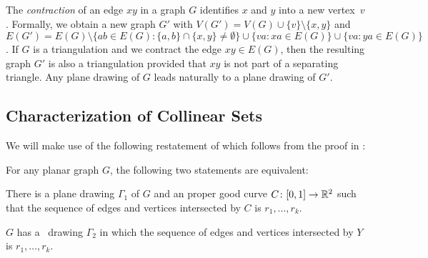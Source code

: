 The \emph{contraction} of an edge $xy$ in a graph $G$ identifies $x$
and $y$
into a new vertex~$v$.
Formally, we obtain a new graph $G'$ with
$V(G')=V(G)\cup\{v\}\setminus\{x,y\}$ and $E(G')=E(G)\setminus\{ab\in
E(G): \{a,b\}\cap\{x,y\}\neq\emptyset\}\cup\{va: xa\in E(G)\}\cup
\{va:ya\in E(G)\}$.  
If $G$ is a triangulation and we
contract the edge $xy\in E(G)$, then the resulting graph $G'$ is also
a triangulation provided that $xy$ is not part of a separating
triangle. %
Any plane drawing of $G$ leads naturally
to a plane drawing of $G'$.

\subsection{Characterization of Collinear Sets}





We will make use of the following restatement of 
which follows from the proof in \cite{dalozzo.dujmovic.ea:drawing}:
\begin{thm}
	For any planar graph $G$, the following two statements are equivalent:
	\begin{compactenum}
		\item There is a plane drawing $\Gamma_1$ of $G$ and an
		proper good curve $C\colon [0,1]\to\mathbb{R}^2$ such that the sequence of edges
		and vertices intersected by $C$ is $r_1,\ldots,r_k$.
		\item $G$ has a \Fary\ drawing $\Gamma_2$ in which the sequence
		of edges and vertices intersected by $Y$ is $r_1,\ldots,r_k$.
	\end{compactenum}
\end{thm}


